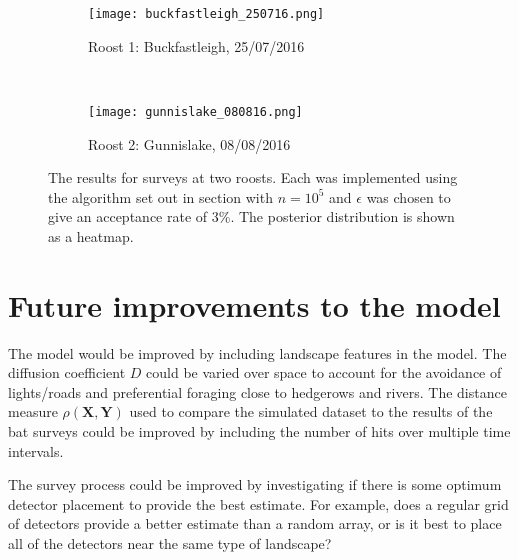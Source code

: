 \begin{figure} [h]
    \centering
    \begin{subfigure}[b]{\ttp}
        \texttt{[image: buckfastleigh\_250716.png]}
        \caption{Roost 1: Buckfastleigh, 25/07/2016}
        \label{fig:buckfastleigh_250716}
    \end{subfigure}
    ~ %
    \begin{subfigure}[b]{\ttp}
        \texttt{[image: gunnislake\_080816.png]}
        \caption{Roost 2: Gunnislake, 08/08/2016}
        \label{fig:gunnislake_080816}
    \end{subfigure}
    \caption{The results for surveys at two roosts. Each was implemented using the algorithm set out in section  with $n=10^5$ and $\epsilon$ was chosen to give an acceptance rate of 3\%. The posterior distribution is shown as a heatmap.}\label{fig:fixed_D}
\end{figure}


\section{Future improvements to the model}

The model would be improved by including landscape features in the model. The
diffusion coefficient $D$ could be varied over space to account for the
avoidance of lights/roads and preferential foraging close to hedgerows and
rivers. The distance measure $\rho(\bm{X}, \bm{Y})$ used to compare the
simulated dataset to the results of the bat surveys could be improved by
including the number of hits over multiple time intervals.

The survey process could be improved by investigating if there is some optimum
detector placement to provide the best estimate. For example, does a regular
grid of detectors provide a better estimate than a random array, or is it best
to place all of the detectors near the same type of landscape?




